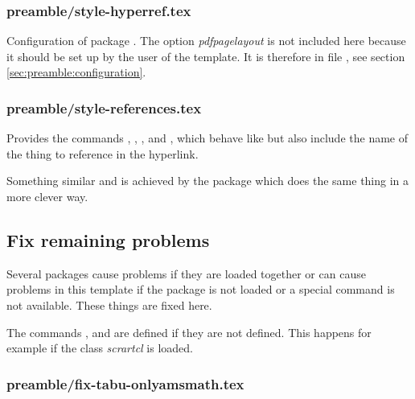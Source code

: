\subsubsection{preamble/style-hyperref.tex}

Configuration of package . The option \emph{pdfpagelayout} is not included here because it should be set up by the user of the template. It is therefore in file , see section \vref{sec:preamble:configuration}.


\subsubsection{preamble/style-references.tex}

Provides the commands , , ,  and , which behave like  but also include the name of the thing to reference in the hyperlink.

Something similar and is achieved by the package  which does the same thing in a more clever way.


\subsection{Fix remaining problems}
\label{sec:style:fix}

Several packages cause problems if they are loaded together or can cause problems in this template if the package is not loaded or a special command is not available. These things are fixed here.

The commands ,  and  are defined if they are not defined. This happens for example if the class \emph{scrartcl} is loaded.


\subsubsection{preamble/fix-tabu-onlyamsmath.tex}

